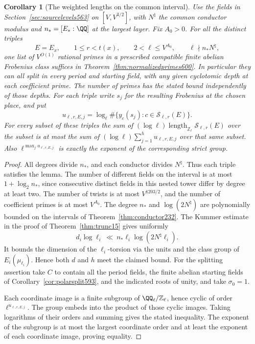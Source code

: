 \documentclass[a4paper,11pt]{article}
\newtheorem{corollary}[proposition]{Corollary}
\theoremstyle{definition}
\theoremstyle{remark}
\newcommand{\ZZ}{\mathbb Z}\newcommand{\ord}{\operatorname{ord}}
\numberwithin{equation}{section}
\begin{document}
\begin{corollary}[The weighted lengths on the common interval]
\leavevmode\label{cor:originalinterval600}
Use the fields in Section~\ref{sec:sourcelevels563} on
\([V,V^{3/2}]\), with \(N^\natural\) the common
conductor modulus and \(n_*=[E_*:\QQ]\) at the largest
layer. Fix \(A_0>0\). For all the distinct triples
\[
 E=E_x,\qquad 1\le r<t(x),\qquad
 2<\ell\le V^{A_0},\qquad \ell\nmid n_*N^\natural ,
\]
one list of \(V^{O(1)}\) rational primes in a prescribed
compatible finite abelian Frobenius class suffices in
Theorem~\ref{thm:normalizedprimes600}. In particular they
can all split in every period and starting field, with
any given cyclotomic depth at each coefficient prime.
The number of primes has the stated bound independently
of those depths. For each triple write \(s_j\) for the
resulting Frobenius at the chosen place, and put
\[
 u_{\ell,r,E,j}=
    \log_\ell\#\{y_c(s_j):c\in\mathcal S_{\ell,r}(E)\}.
\]
For every subset of these triples the sum of
\((\log\ell)\operatorname{length}_{\ZZ_\ell}
\mathcal S_{\ell,r}(E)\) over the subset is at most the
sum of \((\log\ell)\sum_{j=1}^h u_{\ell,r,E,j}\)
over that same subset. Also
\(\ell^{\max_j u_{\ell,r,E,j}}\) is exactly the
exponent of the corresponding strict group.
\end{corollary}
\begin{proof}
All degrees divide \(n_*\), and each conductor divides
\(N^\natural\). Thus each triple satisfies the lemma.
The number of different fields on the interval is at
most \(1+\log_2 n_*\), since consecutive distinct fields
in this nested tower differ by degree at least two.
The number of twists is at most \(V^{1203/2}\), and
the number of coefficient primes is at most \(V^{A_0}\).
The degree \(n_*\) and \(\log(2N^\natural)\) are
polynomially bounded on the intervals of
Theorem~\ref{thm:conductor232}. The Kummer estimate in
the proof of Theorem~\ref{thm:trunc15} gives uniformly
\[
 d_i\log\ell_i\ \ll\
        n_*\ell_i\log(2N^\natural\ell_i).
\]
It bounds the dimension of the \(\ell_i\)-torsion via
the units and the class group of \(E_i(\mu_{\ell_i})\).
Hence both \(d\) and \(h\) meet the claimed bound.
For the splitting assertion take \(C\) to contain all
the period fields, the finite abelian starting fields
of Corollary~\ref{cor:polarsplit593}, and the indicated
roots of unity, and take \(\sigma_0=1\).

Each coordinate image is a finite subgroup of
\(\QQ_\ell/\ZZ_\ell\), hence cyclic of order
\(\ell^{u_{\ell,r,E,j}}\). The group embeds into the
product of those cyclic images. Taking logarithms of
their orders and summing gives the stated inequality.
The exponent of the subgroup is at most the largest
coordinate order and at least the exponent of each
coordinate image, proving equality.
\end{proof}
\end{document}
